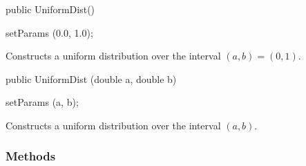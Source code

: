 \begin{code}

   public UniformDist()\begin{hide} {
      setParams (0.0, 1.0);
   }\end{hide}
\end{code}
  \begin{tabb} Constructs a uniform distribution over the interval $(a,b) = (0,1)$.
  \end{tabb}
\begin{code}

   public UniformDist (double a, double b)\begin{hide} {
      setParams (a, b);
   }\end{hide}
\end{code}
  \begin{tabb} Constructs a uniform distribution over the interval $(a,b)$.
  \end{tabb}


\subsubsection* {Methods}

